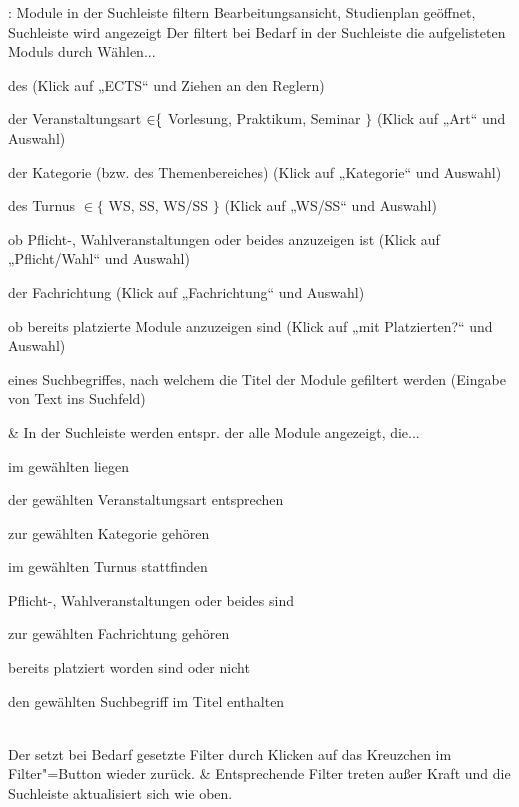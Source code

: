 \begin{usecase}{: Module in der Suchleiste filtern}
	{Bearbeitungsansicht, \gls{Studienplan} geöffnet, Suchleiste wird angezeigt}
	Der  filtert bei Bedarf in der Suchleiste die aufgelisteten \glspl{Modul} durch Wählen...
	\begin{tblitemize}
		\item des \opt{}  (Klick auf „ECTS“ und Ziehen an den Reglern)
		\item der Veranstaltungsart\opt{} $\in\hspace{-3pt}\{$ Vorlesung, Praktikum, Seminar $\}$ (Klick auf „Art“ und Auswahl)
		\item der Kategorie\opt{} (bzw. des Themenbereiches) (Klick auf „Kategorie“ und Auswahl)
		\item des Turnus\opt{} $\in \{$ WS, SS, WS/SS $\}$ (Klick auf „WS/SS“ und Auswahl)
		\item ob Pflicht-, Wahlveranstaltungen oder beides anzuzeigen ist\opt{} (Klick auf „Pflicht/Wahl“ und Auswahl)
		\item der Fachrichtung\opt{} (Klick auf „Fachrichtung“ und Auswahl)
		\item ob bereits platzierte Module anzuzeigen sind\opt{} (Klick auf „mit Platzierten?“ und Auswahl)
		\item eines Suchbegriffes, nach welchem die Titel der Module gefiltert werden (Eingabe von Text ins Suchfeld)
	\end{tblitemize}
	& In der Suchleiste werden entspr. der  alle Module angezeigt, die...
	\begin{tblitemize}
		\item im gewählten  liegen\opt
		\item der gewählten Veranstaltungsart entsprechen\opt
		\item zur gewählten Kategorie gehören\opt
		\item im gewählten Turnus stattfinden\opt
		\item Pflicht-, Wahlveranstaltungen oder beides sind\opt
		\item zur gewählten Fachrichtung gehören\opt
		\item bereits platziert worden sind oder nicht\opt
		\item den gewählten Suchbegriff im Titel enthalten
	\end{tblitemize} \\
	\hline
	Der  setzt bei Bedarf gesetzte Filter durch Klicken auf das Kreuzchen im Filter"=Button wieder zurück.
	& Entsprechende Filter treten außer Kraft und die Suchleiste aktualisiert sich wie oben.
\end{usecase}

